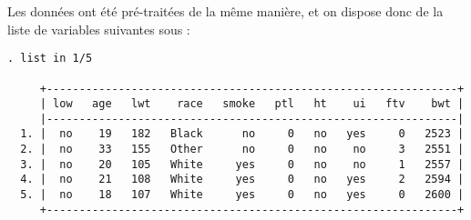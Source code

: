 Les données ont été pré-traitées de la même manière, et on dispose donc de
la liste de variables suivantes sous \Stata :
\begin{verbatim}
. list in 1/5

     +---------------------------------------------------------------+
     | low   age   lwt    race   smoke   ptl   ht    ui   ftv    bwt |
     |---------------------------------------------------------------|
  1. |  no    19   182   Black      no     0   no   yes     0   2523 |
  2. |  no    33   155   Other      no     0   no    no     3   2551 |
  3. |  no    20   105   White     yes     0   no    no     1   2557 |
  4. |  no    21   108   White     yes     0   no   yes     2   2594 |
  5. |  no    18   107   White     yes     0   no   yes     0   2600 |
     +---------------------------------------------------------------+
\end{verbatim}
